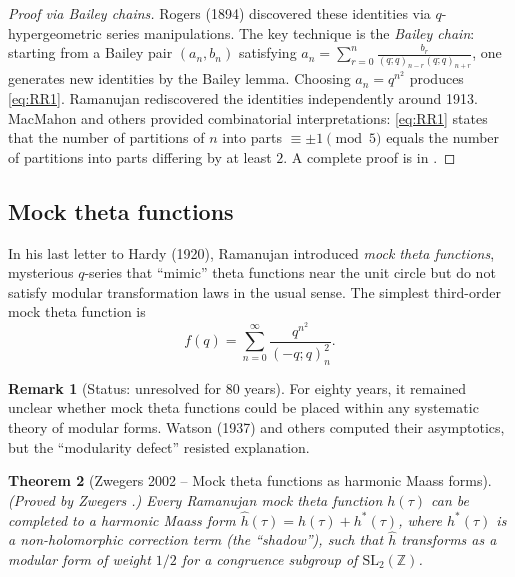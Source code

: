 \documentclass[12pt,a4paper]{amsart}
\newtheorem{theorem}{Theorem}[section]
\theoremstyle{definition}
\newtheorem{remark}[theorem]{Remark}
\begin{document}
\begin{proof}[Proof via Bailey chains]
Rogers (1894) discovered these identities via $q$-hypergeometric series manipulations.
The key technique is the \emph{Bailey chain}: starting from a Bailey pair $(a_n, b_n)$
satisfying $a_n = \sum_{r=0}^n \frac{b_r}{(q;q)_{n-r}(q;q)_{n+r}}$,
one generates new identities by the Bailey lemma.
Choosing $a_n = q^{n^2}$ produces \eqref{eq:RR1}.
Ramanujan rediscovered the identities independently around 1913.
MacMahon and others provided combinatorial interpretations:
\eqref{eq:RR1} states that the number of partitions of $n$ into parts
$\equiv \pm 1 \pmod{5}$ equals the number of partitions into parts
differing by at least $2$. A complete proof is in \cite{Andrews1998}.
\end{proof}

\subsection{Mock theta functions}

In his last letter to Hardy (1920), Ramanujan introduced \emph{mock theta functions},
mysterious $q$-series that ``mimic'' theta functions near the unit circle but
do not satisfy modular transformation laws in the usual sense.
The simplest third-order mock theta function is
\[
  f(q) = \sum_{n=0}^{\infty} \frac{q^{n^2}}{(-q;q)_n^2}.
\]

\begin{remark}[Status: unresolved for 80 years]
For eighty years, it remained unclear whether mock theta functions
could be placed within any systematic theory of modular forms.
Watson (1937) and others computed their asymptotics, but the
``modularity defect'' resisted explanation.
\end{remark}

\begin{theorem}[Zwegers 2002 -- Mock theta functions as harmonic Maass forms]\label{thm:zwegers}
\textup{(Proved by Zwegers \cite{Zwegers2002}.)}
Every Ramanujan mock theta function $h(\tau)$ can be completed to a
\emph{harmonic Maass form} $\widehat{h}(\tau) = h(\tau) + h^*(\tau)$,
where $h^*(\tau)$ is a non-holomorphic correction term (the ``shadow''),
such that $\widehat{h}$ transforms as a modular form of weight $1/2$
for a congruence subgroup of $\mathrm{SL}_2(\mathbb{Z})$.
\end{theorem}
\end{document}
